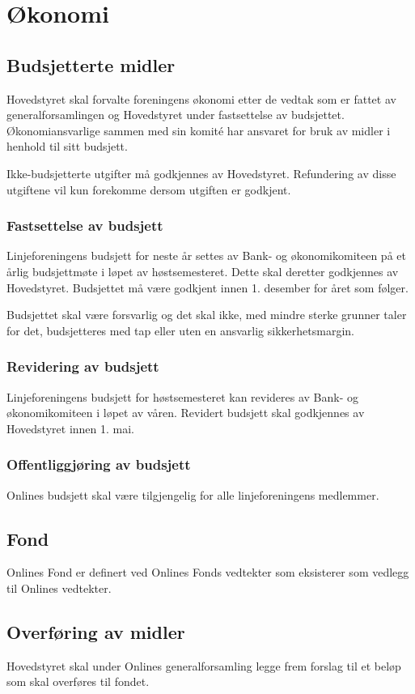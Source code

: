 \chapter{Økonomi}
\label{chap:okonomi}
\vspace{23pt}

\section{Budsjetterte midler}
Hovedstyret skal forvalte foreningens økonomi etter de vedtak som er fattet av generalforsamlingen og Hovedstyret under fastsettelse av budsjettet. Økonomiansvarlige sammen med sin komité har ansvaret for bruk av midler i henhold til sitt budsjett.

Ikke-budsjetterte utgifter må godkjennes av Hovedstyret. Refundering av disse utgiftene vil kun forekomme dersom utgiften er godkjent.

\subsection{Fastsettelse av budsjett}
Linjeforeningens budsjett for neste år settes av Bank- og økonomikomiteen på et årlig budsjettmøte i løpet av høstsemesteret. Dette skal deretter godkjennes av Hovedstyret. Budsjettet må være godkjent innen 1. desember for året som følger.

Budsjettet skal være forsvarlig og det skal ikke, med mindre sterke grunner taler for det, budsjetteres med tap eller uten en ansvarlig sikkerhetsmargin.

\subsection{Revidering av budsjett}
Linjeforeningens budsjett for høstsemesteret kan revideres av Bank- og økonomikomiteen i løpet av våren. Revidert budsjett skal godkjennes av Hovedstyret innen 1. mai.

\subsection{Offentliggjøring av budsjett}
Onlines budsjett skal være tilgjengelig for alle linjeforeningens medlemmer.

\section{Fond}
\vspace{23pt}

Onlines Fond er definert ved Onlines Fonds vedtekter som eksisterer som vedlegg til Onlines vedtekter.

\section{Overføring av midler}
\vspace{23pt}

Hovedstyret skal under Onlines generalforsamling legge frem forslag til et beløp som skal overføres til fondet.
